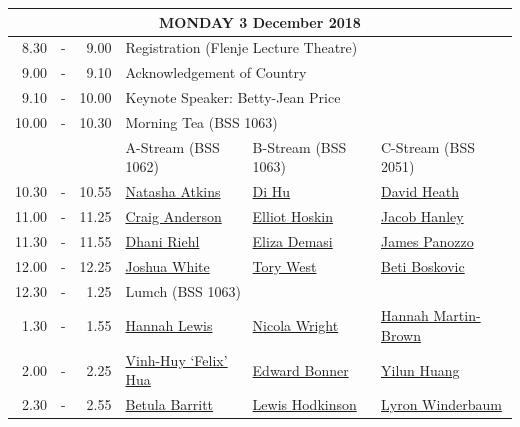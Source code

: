 \documentclass[twoside,12pt,a4paper,notitlepage]{memoir}
\begin{document}
\renewcommand{\arraystretch}{1.4}
\begin{center}
\begin{tabular}{rcr|p{3.6cm}|p{3.6cm}|p{3.6cm}}
\multicolumn{6}{c}{{\large MONDAY 3 December 2018}} \\ \hline
8.30 & - & 9.00 & \multicolumn{3}{l}{Registration (Flenje Lecture Theatre)} \\ \hline
9.00 & - & 9.10 & \multicolumn{3}{l}{Acknowledgement of Country} \\ \hline
9.10 & - & 10.00 & \multicolumn{3}{l}{Keynote Speaker: Betty-Jean Price} \\ \hline
10.00 & - & 10.30 & \multicolumn{3}{l}{Morning Tea (BSS 1063)} \\ \hline
 & & & A-Stream \hspace{1cm} (BSS 1062) & B-Stream \hspace{1cm} (BSS 1063) & C-Stream \hspace{1cm} (BSS 2051) \\ \hline
 10.30 & - & 10.55 & 
 \hyperref[aut:atkins]{Natasha Atkins} & 
 \hyperref[aut:hu]{Di Hu} &  
 \hyperref[aut:heath]{David Heath} \\ \hline
11.00 & - & 11.25 &
 \hyperref[aut:anderson]{Craig Anderson} &
 \hyperref[aut:hoskin]{Elliot Hoskin} &
 \hyperref[aut:hanley]{Jacob Hanley} \\ \hline
11.30 & - & 11.55 &
 \hyperref[aut:riehl]{Dhani Riehl} &
 \hyperref[aut:demasi]{Eliza Demasi} &
 \hyperref[aut:panozzo]{James Panozzo} \\ \hline
12.00 & - & 12.25 &
 \hyperref[aut:white]{Joshua White} &
 \hyperref[aut:west]{Tory West} &
 \hyperref[aut:boskovic]{Beti Boskovic} \\ \hline
12.30 & - & 1.25 & \multicolumn{3}{l}{Lumch (BSS 1063)} \\ \hline
1.30 & - & 1.55 &
 \hyperref[aut:lewis]{Hannah Lewis} &
 \hyperref[aut:wright]{Nicola Wright} &
 \hyperref[aut:brown]{Hannah Martin-Brown} \\ \hline
2.00 & - & 2.25 &
 \hyperref[aut:hua]{Vinh-Huy `Felix' Hua} &
 \hyperref[aut:bonner]{Edward Bonner} &
 \hyperref[aut:huang]{Yilun Huang} \\ \hline
2.30 & - & 2.55 &
 \hyperref[aut:barritt]{Betula Barritt} &
 \hyperref[aut:hodkinson]{Lewis Hodkinson} &
 \hyperref[aut:winderbaum]{Lyron Winderbaum} \\ \hline
\end{tabular}
\end{center}
\vfill
\end{document}
